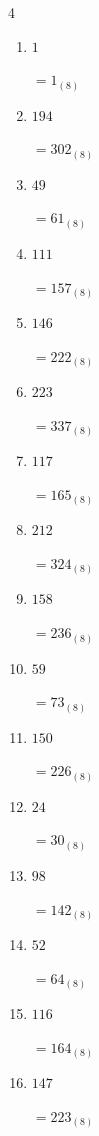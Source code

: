 \begin{multicols}{4}
\begin{enumerate}
  \item $1$

        $=1_{(8)}$

  \item $194$

        $=302_{(8)}$

  \item $49$

        $=61_{(8)}$

  \item $111$

        $=157_{(8)}$

  \item $146$

        $=222_{(8)}$

  \item $223$

        $=337_{(8)}$

  \item $117$

        $=165_{(8)}$

  \item $212$

        $=324_{(8)}$

  \item $158$

        $=236_{(8)}$

  \item $59$

        $=73_{(8)}$

  \item $150$

        $=226_{(8)}$

  \item $24$

        $=30_{(8)}$

  \item $98$

        $=142_{(8)}$

  \item $52$

        $=64_{(8)}$

\columnbreak %

\resetques

  \item $116$

        $=164_{(8)}$

  \item $147$

        $=223_{(8)}$


\end{enumerate}
\end{multicols}
